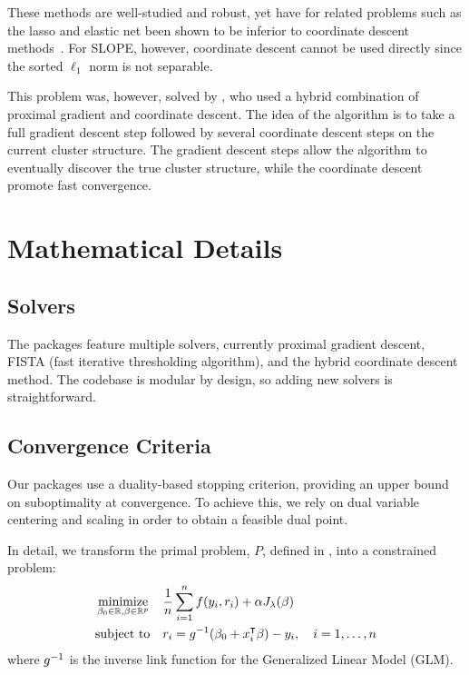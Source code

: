 \documentclass[article]{jss}
\let\Cref\crtCref
\begin{document}
These methods are well-studied and robust, yet have for related problems such
as the lasso and elastic net been shown to be inferior to coordinate descent
methods~\citep{friedman2007,friedman2010}. For SLOPE, however, coordinate
descent cannot be used directly since the sorted \(\ell_1\) norm is not
separable.

This problem was, however, solved by \citet{larsson2023}, who used a hybrid
combination of proximal gradient and coordinate descent. The idea of the
algorithm is to take a full gradient descent step followed by several
coordinate descent steps on the current cluster structure. The gradient descent
steps allow the algorithm to eventually discover the true cluster structure,
while the coordinate descent promote fast convergence.

\section{Mathematical Details}

\subsection{Solvers}

The packages feature multiple solvers, currently proximal gradient descent,
FISTA (fast iterative thresholding algorithm), and the hybrid
coordinate descent method. The codebase is modular by design, so
adding new solvers is straightforward.

\subsection{Convergence Criteria}

Our packages use a duality-based stopping criterion, providing an upper
bound on suboptimality at convergence. To achieve this, we rely
on dual variable centering and scaling in order to obtain a feasible dual
point.

In detail, we transform the primal problem, \(P\), defined in \Cref{eq:slope}, into a
constrained problem:
\begin{equation}
  \label{eq:slope-constrained}
  \begin{aligned}
     & \operatorname*{minimize}_{\beta_0 \in \mathbb{R},\beta \in \mathbb{R}^p} &  & \frac{1}{n} \sum_{i=1}^n f(y_i, r_i) + \alpha J_{\lambda}(\beta)          \\
     & \text{subject to}                                         &  & r_i = g^{-1}(\beta_0 + x_i^\intercal \beta) - y_i, \quad i = 1, \ldots, n \\
  \end{aligned}
\end{equation}
where \(g^{-1}\) is the inverse link function for the Generalized Linear Model (GLM).
\end{document}
